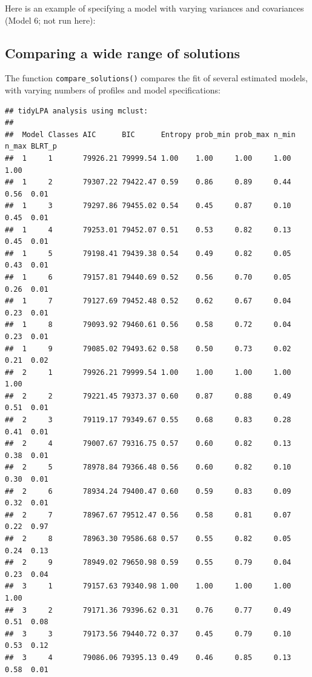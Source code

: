 \documentclass[
  english,
  man]{apa6}
\begin{document}
Here is an example of specifying a model with varying variances and covariances
(Model 6; not run here):

\hypertarget{comparing-a-wide-range-of-solutions}{%
\subsection{Comparing a wide range of solutions}\label{comparing-a-wide-range-of-solutions}}

The function \texttt{compare\_solutions()} compares the fit of several estimated models,
with varying numbers of profiles and model specifications:

\begin{verbatim}
## tidyLPA analysis using mclust: 
## 
##  Model Classes AIC      BIC      Entropy prob_min prob_max n_min n_max BLRT_p
##  1     1       79926.21 79999.54 1.00    1.00     1.00     1.00  1.00        
##  1     2       79307.22 79422.47 0.59    0.86     0.89     0.44  0.56  0.01  
##  1     3       79297.86 79455.02 0.54    0.45     0.87     0.10  0.45  0.01  
##  1     4       79253.01 79452.07 0.51    0.53     0.82     0.13  0.45  0.01  
##  1     5       79198.41 79439.38 0.54    0.49     0.82     0.05  0.43  0.01  
##  1     6       79157.81 79440.69 0.52    0.56     0.70     0.05  0.26  0.01  
##  1     7       79127.69 79452.48 0.52    0.62     0.67     0.04  0.23  0.01  
##  1     8       79093.92 79460.61 0.56    0.58     0.72     0.04  0.23  0.01  
##  1     9       79085.02 79493.62 0.58    0.50     0.73     0.02  0.21  0.02  
##  2     1       79926.21 79999.54 1.00    1.00     1.00     1.00  1.00        
##  2     2       79221.45 79373.37 0.60    0.87     0.88     0.49  0.51  0.01  
##  2     3       79119.17 79349.67 0.55    0.68     0.83     0.28  0.41  0.01  
##  2     4       79007.67 79316.75 0.57    0.60     0.82     0.13  0.38  0.01  
##  2     5       78978.84 79366.48 0.56    0.60     0.82     0.10  0.30  0.01  
##  2     6       78934.24 79400.47 0.60    0.59     0.83     0.09  0.32  0.01  
##  2     7       78967.67 79512.47 0.56    0.58     0.81     0.07  0.22  0.97  
##  2     8       78963.30 79586.68 0.57    0.55     0.82     0.05  0.24  0.13  
##  2     9       78949.02 79650.98 0.59    0.55     0.79     0.04  0.23  0.04  
##  3     1       79157.63 79340.98 1.00    1.00     1.00     1.00  1.00        
##  3     2       79171.36 79396.62 0.31    0.76     0.77     0.49  0.51  0.08  
##  3     3       79173.56 79440.72 0.37    0.45     0.79     0.10  0.53  0.12  
##  3     4       79086.06 79395.13 0.49    0.46     0.85     0.13  0.58  0.01  

\end{verbatim}
\end{document}

